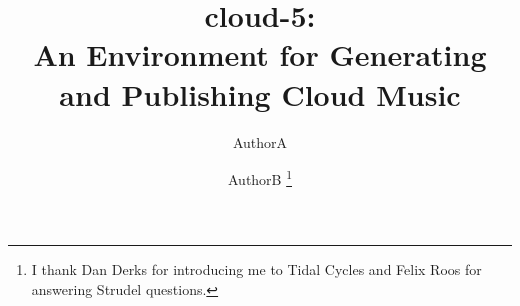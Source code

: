 \documentclass[runningheads,a4paper]{llncs}
\begin{document}
\mainmatter  %

\title{cloud-5:\\An Environment for Generating and Publishing Cloud Music}




\author{AuthorA\and AuthorB \thanks{I thank Dan Derks for introducing me to Tidal Cycles and Felix Roos for answering Strudel questions.}}
%


%
%


\maketitle
\end{document}
